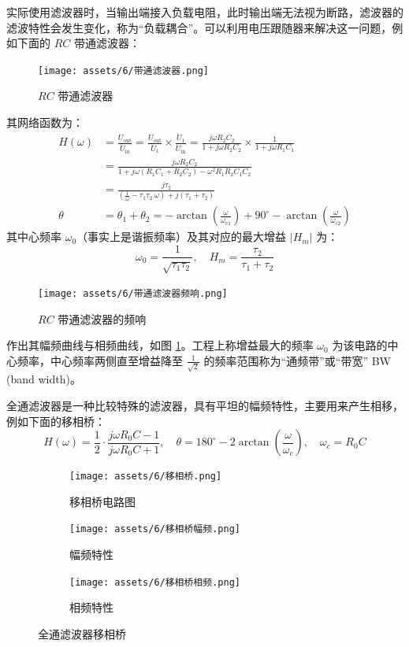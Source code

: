 \documentclass[UTF8]{report}
\theoremstyle{MyLineTheoremStyle} %
\theoremstyle{MyBlockTheoremStyle} %
\theoremstyle{MySubsubsectionStyle} %
\begin{document}
实际使用滤波器时，当输出端接入负载电阻，此时输出端无法视为断路，滤波器的滤波特性会发生变化，称为“负载耦合”。可以利用电压跟随器来解决这一问题，例如下面的 $RC$ 带通滤波器：
\begin{figure}[H]\centering
    \texttt{[image: assets/6/带通滤波器.png]}
    \caption{$RC$ 带通滤波器}
\end{figure}
其网络函数为：
\begin{align}
H(\omega) &= \frac{\dot{U}_{\text{out}}}{\dot{U}_{\text{in}}} = \frac{\dot{U}_{\text{out}}}{\dot{U}_{\text{1}}} \times \frac{\dot{U}_{\text{1}}}{\dot{U}_{\text{in}}} = \frac{j \omega R_2 C_2}{1 + j \omega R_2 C_2} \times \frac{1}{1 + j \omega R_1 C_1} \\
&= \frac{j \omega R_2 C_2}{1 + j \omega (R_1 C_1 + R_2 C_2) - \omega^2 R_1 R_2 C_1 C_2} \\ 
&= \frac{j \tau_2}{ \left( \frac{1}{\omega} - \tau_1 \tau_2 \  \omega \right) + j\left(\tau_1 + \tau_2\right) } \\ 
\theta &= \theta_1 + \theta_2 = -\arctan \left(\frac{\omega}{\omega_{c1}}\right) + 90^\circ - \arctan \left(\frac{\omega}{\omega_{c2}}\right)
\end{align}
其中心频率 $\omega_0$（事实上是谐振频率）及其对应的最大增益 $| H_m |$ 为：
\begin{equation}
\omega_0 = \frac{1}{\sqrt{\tau_1 \tau_2}} ,\quad H_m = \frac{\tau_2}{\tau_1 + \tau_2}
\end{equation}
\begin{figure}[H]\centering
    \texttt{[image: assets/6/带通滤波器频响.png]}
    \caption{$RC$ 带通滤波器的频响}
    \label{RC 带通滤波器的频响}
\end{figure}
作出其幅频曲线与相频曲线，如图 \ref{RC 带通滤波器的频响}。工程上称增益最大的频率 $\omega_0$ 为该电路的中心频率，中心频率两侧直至增益降至 $\frac{1}{\sqrt{2}}$ 的频率范围称为“通频带”或“带宽” BW (band width)。


全通滤波器是一种比较特殊的滤波器，具有平坦的幅频特性，主要用来产生相移，例如下面的移相桥：
\begin{equation}
H(\omega) = \frac{1}{2}\cdot\frac{j\omega R_0C - 1}{j\omega R_0C + 1},\quad \theta = 180^{\circ} - 2 \arctan \left(\frac{\omega}{\omega_c} \right),\quad \omega_c = R_0C
\end{equation}
\begin{figure}[H]\centering
\begin{subfigure}[b]{0.25\columnwidth}\centering
    \texttt{[image: assets/6/移相桥.png]}
    \caption{移相桥电路图}
\end{subfigure}\hfill
\begin{subfigure}[b]{0.37\columnwidth}\centering
    \texttt{[image: assets/6/移相桥幅频.png]}
    \caption{幅频特性}
\end{subfigure}
\begin{subfigure}[b]{0.37\columnwidth}\centering
    \texttt{[image: assets/6/移相桥相频.png]}
    \caption{相频特性}
\end{subfigure}
\caption{全通滤波器移相桥}
\end{figure}
\end{document}
